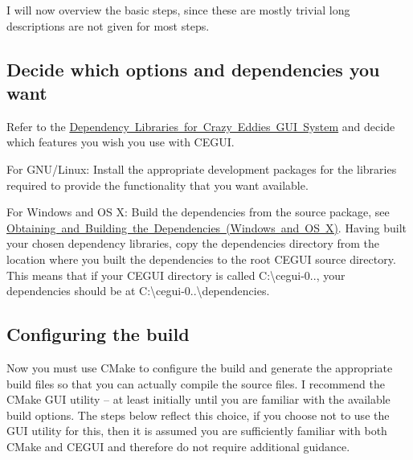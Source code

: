 I will now overview the basic steps, since these are mostly trivial long descriptions are not given for most steps. \hypertarget{compiling_compiling_build_decide}{}\subsection{Decide which options and dependencies you want}\label{compiling_compiling_build_decide}
Refer to the \mbox{\hyperlink{dependencies}{Dependency Libraries for Crazy Eddie\textquotesingle{}s G\+UI System}} and decide which features you wish you use with C\+E\+G\+UI.
\begin{DoxyItemize}
\item For G\+N\+U/\+Linux\+: Install the appropriate development packages for the libraries required to provide the functionality that you want available.
\item For Windows and OS X\+: Build the dependencies from the source package, see \mbox{\hyperlink{building_deps}{Obtaining and Building the Dependencies (Windows and OS X)}}. Having built your chosen dependency libraries, copy the {\ttfamily dependencies} directory from the location where you built the dependencies to the root C\+E\+G\+UI source directory. This means that if your C\+E\+G\+UI directory is called {\ttfamily C\+:\textbackslash{}cegui-\/0..}, your dependencies should be at {\ttfamily C\+:\textbackslash{}cegui-\/0..\textbackslash{}dependencies}. 
\end{DoxyItemize}\hypertarget{compiling_compiling_build_configuring}{}\subsection{Configuring the build}\label{compiling_compiling_build_configuring}
Now you must use C\+Make to configure the build and generate the appropriate build files so that you can actually compile the source files. I recommend the C\+Make G\+UI utility – at least initially until you are familiar with the available build options. The steps below reflect this choice, if you choose not to use the G\+UI utility for this, then it is assumed you are sufficiently familiar with both C\+Make and C\+E\+G\+UI and therefore do not require additional guidance.

